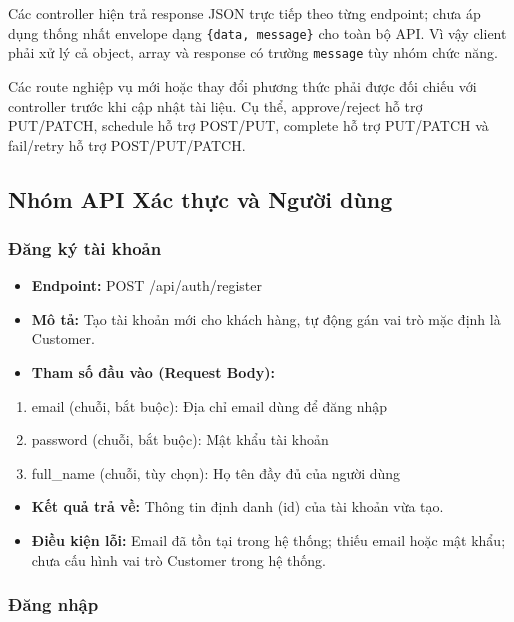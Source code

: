 Các controller hiện trả response JSON trực tiếp theo từng endpoint; chưa áp dụng thống nhất envelope dạng \texttt{\{data, message\}} cho toàn bộ API. Vì vậy client phải xử lý cả object, array và response có trường \texttt{message} tùy nhóm chức năng.

Các route nghiệp vụ mới hoặc thay đổi phương thức phải được đối chiếu với controller trước khi cập nhật tài liệu. Cụ thể, approve/reject hỗ trợ PUT/PATCH, schedule hỗ trợ POST/PUT, complete hỗ trợ PUT/PATCH và fail/retry hỗ trợ POST/PUT/PATCH.

\subsection{Nhóm API Xác thực và Người dùng}

\subsubsection{Đăng ký tài khoản}

\begin{itemize}
\item
  \textbf{Endpoint:} POST /api/auth/register
\item
  \textbf{Mô tả:} Tạo tài khoản mới cho khách hàng, tự động gán vai trò mặc định là Customer.
\item
  \textbf{Tham số đầu vào (Request Body):}
\end{itemize}

\begin{enumerate}
\def\labelenumi{\arabic{enumi}.}
\item
  email (chuỗi, bắt buộc): Địa chỉ email dùng để đăng nhập
\item
  password (chuỗi, bắt buộc): Mật khẩu tài khoản
\item
  full\_name (chuỗi, tùy chọn): Họ tên đầy đủ của người dùng
\end{enumerate}

\begin{itemize}
\item
  \textbf{Kết quả trả về:} Thông tin định danh (id) của tài khoản vừa tạo.
\item
  \textbf{Điều kiện lỗi:} Email đã tồn tại trong hệ thống; thiếu email hoặc mật khẩu; chưa cấu hình vai trò Customer trong hệ thống.
\end{itemize}

\subsubsection{Đăng nhập}

